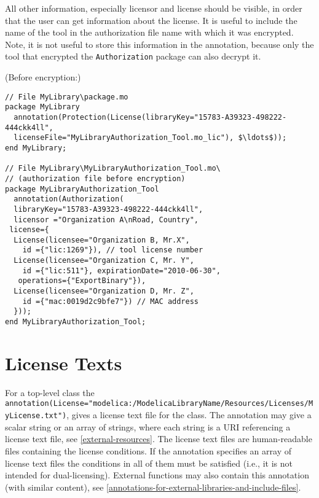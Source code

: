 \begin{nonnormative}
All other information, especially licensor and license should be visible, in order that the user can get information about the license.
It is useful to include the name of the tool in the authorization file name with which it was encrypted.
Note, it is not useful to store this information in the annotation, because only the tool that encrypted the \lstinline!Authorization! package can also decrypt it.
\end{nonnormative}

\begin{example}
(Before encryption:)
\begin{lstlisting}[language=modelica]
// File MyLibrary\package.mo
package MyLibrary
  annotation(Protection(License(libraryKey="15783-A39323-498222-444ckk4ll",
  licenseFile="MyLibraryAuthorization_Tool.mo_lic"), $\ldots$));
end MyLibrary;

// File MyLibrary\MyLibraryAuthorization_Tool.mo\
// (authorization file before encryption)
package MyLibraryAuthorization_Tool
  annotation(Authorization(
  libraryKey="15783-A39323-498222-444ckk4ll",
  licensor ="Organization A\nRoad, Country",
 license={
  License(licensee="Organization B, Mr.X",
    id ={"lic:1269"}), // tool license number
  License(licensee="Organization C, Mr. Y",
    id ={"lic:511"}, expirationDate="2010-06-30",
   operations={"ExportBinary"}),
  License(licensee="Organization D, Mr. Z",
    id ={"mac:0019d2c9bfe7"}) // MAC address
  }));
end MyLibraryAuthorization_Tool;
\end{lstlisting}
\end{example}


\section{License Texts}\label{license-texts}

For a top-level class the {\lstinline!annotation(License="modelica:/ModelicaLibraryName/Resources/Licenses/MyLicense.txt")!}, gives a license text file for the class.
The annotation may give a scalar string or an array of strings, where each string is a URI referencing a license text file, see \cref{external-resources}.
The license text files are human-readable files containing the license conditions.
If the annotation specifies an array of license text files the conditions in all of them must be satisfied (i.e., it is not intended for dual-licensing).
External functions may also contain this annotation (with similar content), see \cref{annotations-for-external-libraries-and-include-files}.

